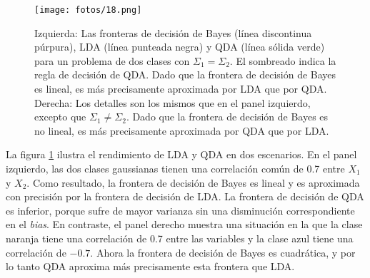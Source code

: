 \begin{figure}[h]
\centering
\texttt{[image: fotos/18.png]}
\caption{Izquierda: Las fronteras de decisión de Bayes (línea discontinua púrpura), LDA (línea punteada negra) y QDA (línea sólida verde) para un problema de dos clases con $\Sigma_1 = \Sigma_2$. El sombreado indica la regla de decisión de QDA. Dado que la frontera de decisión de Bayes es lineal, es más precisamente aproximada por LDA que por QDA. Derecha: Los detalles son los mismos que en el panel izquierdo, excepto que $\Sigma_1 \neq \Sigma_2$. Dado que la frontera de decisión de Bayes es no lineal, es más precisamente aproximada por QDA que por LDA.}
\label{fig:4.9}
\end{figure}

La figura \ref{fig:4.9} ilustra el rendimiento de LDA y QDA en dos escenarios. En el panel izquierdo, las dos clases gaussianas tienen una correlación común de 0.7 entre $X_1$ y $X_2$. Como resultado, la frontera de decisión de Bayes es lineal y es aproximada con precisión por la frontera de decisión de LDA. La frontera de decisión de QDA es inferior, porque sufre de mayor varianza sin una disminución correspondiente en el \textit{bias}. En contraste, el panel derecho muestra una situación en la que la clase naranja tiene una correlación de 0.7 entre las variables y la clase azul tiene una correlación de $-0.7$. Ahora la frontera de decisión de Bayes es cuadrática, y por lo tanto QDA aproxima más precisamente esta frontera que LDA.